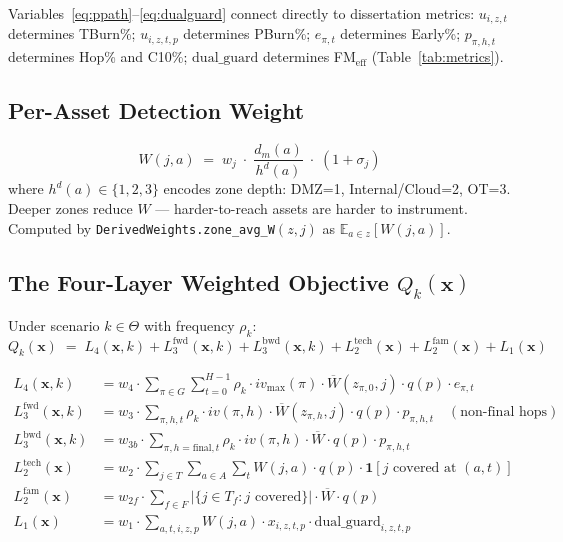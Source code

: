 \documentclass[12pt,a4paper]{article}
\newcommand{\xvec}{\mathbf{x}}
\newcommand{\xiztp}{x_{i,z,t,p}}
\newcommand{\Wja}{W(j,a)}
\newcommand{\Qkx}{Q_k(\xvec)}
\newcommand{\dg}{\mathrm{dual\_guard}}
\begin{document}
Variables~\eqref{eq:ppath}--\eqref{eq:dualguard} connect directly to dissertation metrics:
$u_{i,z,t}$ determines TBurn\%; $u_{i,z,t,p}$ determines PBurn\%;
$e_{\pi,t}$ determines Early\%; $p_{\pi,h,t}$ determines Hop\% and C10\%;
$\dg$ determines FM$_{\mathrm{eff}}$ (Table~\ref{tab:metrics}).

\subsection{Per-Asset Detection Weight}

\begin{equation}
\label{eq:weight}
\Wja \;=\; w_j \;\cdot\; \frac{d_m(a)}{h^d(a)} \;\cdot\; (1 + \sigma_j)
\tag{8}
\end{equation}
where $h^d(a)\in\{1,2,3\}$ encodes zone depth: DMZ=1, Internal/Cloud=2, OT=3.
Deeper zones reduce $W$ — harder-to-reach assets are harder to instrument.
Computed by \texttt{DerivedWeights.zone\_avg\_W}$(z,j)$ as $\mathbb{E}_{a\in z}[W(j,a)]$.

\subsection{The Four-Layer Weighted Objective $Q_k(\mathbf{x})$}
\label{sec:objective}

Under scenario $k\in\Theta$ with frequency $\rho_k$:
\begin{equation}
\label{eq:objective}
\Qkx \;=\; L_4(\xvec,k) + L_3^{\mathrm{fwd}}(\xvec,k) + L_3^{\mathrm{bwd}}(\xvec,k)
         + L_2^{\mathrm{tech}}(\xvec) + L_2^{\mathrm{fam}}(\xvec) + L_1(\xvec)
\tag{9}
\end{equation}

\begin{align}
L_4(\xvec,k) &= w_4 \cdot \sum_{\pi\in G}\sum_{t=0}^{H-1}
  \rho_k \cdot iv_{\max}(\pi) \cdot \overline{W}(z_{\pi,0},j) \cdot q(p) \cdot e_{\pi,t}
  \tag{10}\label{eq:L4}\\
L_3^{\mathrm{fwd}}(\xvec,k) &= w_3 \cdot \sum_{\pi,h,t}
  \rho_k \cdot iv(\pi,h) \cdot \overline{W}(z_{\pi,h},j) \cdot q(p) \cdot p_{\pi,h,t}
  \quad(\text{non-final hops})
  \tag{11}\label{eq:L3f}\\
L_3^{\mathrm{bwd}}(\xvec,k) &= w_{3b} \cdot \sum_{\pi,h=\text{final},t}
  \rho_k \cdot iv(\pi,h) \cdot \overline{W} \cdot q(p) \cdot p_{\pi,h,t}
  \tag{12}\label{eq:L3b}\\
L_2^{\mathrm{tech}}(\xvec) &= w_2 \cdot \sum_{j\in T}\sum_{a\in A}\sum_t
  W(j,a) \cdot q(p) \cdot \mathbf{1}[j\text{ covered at }(a,t)]
  \tag{13}\label{eq:L2t}\\
L_2^{\mathrm{fam}}(\xvec) &= w_{2f} \cdot \sum_{f\in F}
  |\{j\in T_f : j\text{ covered}\}| \cdot \overline{W} \cdot q(p)
  \tag{14}\label{eq:L2f}\\
L_1(\xvec) &= w_1 \cdot \sum_{a,t,i,z,p}
  W(j,a) \cdot \xiztp \cdot \dg_{i,z,t,p}
  \tag{15}\label{eq:L1}
\end{align}
\end{document}
